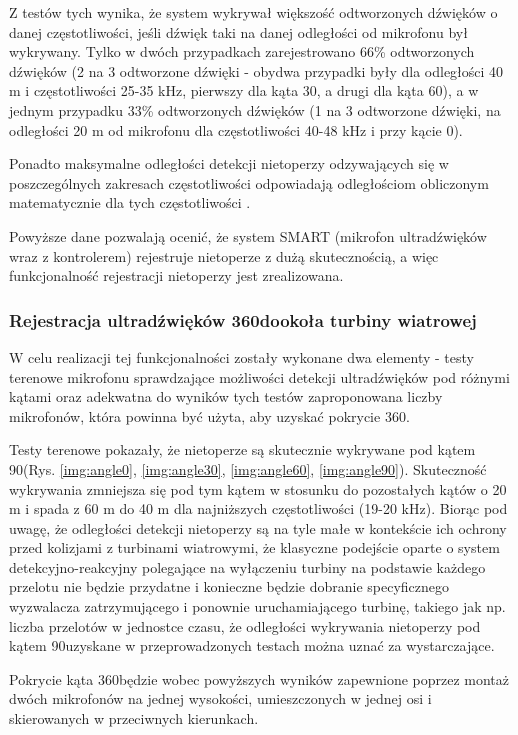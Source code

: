 \documentclass{sprz}
\begin{document}
Z testów tych wynika, że system wykrywał większość odtworzonych dźwięków o danej częstotliwości, jeśli dźwięk taki na danej odległości od mikrofonu był wykrywany. Tylko w dwóch przypadkach zarejestrowano 66\% odtworzonych dźwięków (2 na 3 odtworzone dźwięki - obydwa przypadki były dla odległości 40 m i częstotliwości 25-35 kHz, pierwszy dla kąta 30\textdegree, a drugi dla kąta 60\textdegree ), a w jednym przypadku 33\% odtworzonych dźwięków (1 na 3 odtworzone dźwięki, na odległości 20 m od mikrofonu dla częstotliwości 40-48 kHz i przy kącie 0\textdegree).

Ponadto maksymalne odległości detekcji nietoperzy odzywających się w poszczególnych zakresach częstotliwości odpowiadają odległościom obliczonym matematycznie dla tych częstotliwości \cite{agranat}. 

Powyższe dane pozwalają ocenić, że system SMART (mikrofon ultradźwięków wraz z kontrolerem) rejestruje nietoperze z dużą skutecznością, a więc funkcjonalność rejestracji nietoperzy jest zrealizowana.

\subsubsection{Rejestracja ultradźwięków 360\textdegree dookoła turbiny wiatrowej}
W celu realizacji tej funkcjonalności zostały wykonane dwa elementy - testy terenowe mikrofonu sprawdzające możliwości detekcji ultradźwięków pod różnymi kątami oraz adekwatna do wyników tych testów zaproponowana liczby mikrofonów, która powinna być użyta, aby uzyskać pokrycie 360\textdegree. 

Testy terenowe pokazały, że nietoperze są skutecznie wykrywane pod kątem 90\textdegree (Rys. \ref{img:angle0}, \ref{img:angle30}, \ref{img:angle60}, \ref{img:angle90}). Skuteczność wykrywania zmniejsza się pod tym kątem w stosunku do pozostałych kątów o 20 m i spada z 60 m do 40 m dla najniższych częstotliwości (19-20 kHz). Biorąc pod uwagę, że odległości detekcji nietoperzy są na tyle małe w kontekście ich ochrony przed kolizjami z turbinami wiatrowymi, że klasyczne podejście oparte o system detekcyjno-reakcyjny polegające
na wyłączeniu turbiny na podstawie każdego przelotu nie będzie przydatne i konieczne będzie dobranie specyficznego wyzwalacza zatrzymującego i ponownie uruchamiającego turbinę, takiego jak np. liczba przelotów w jednostce czasu, że odległości wykrywania nietoperzy pod kątem 90\textdegree uzyskane w przeprowadzonych testach można uznać za wystarczające. 

Pokrycie kąta 360\textdegree będzie wobec powyższych wyników zapewnione poprzez montaż dwóch mikrofonów na jednej wysokości, umieszczonych w jednej osi i skierowanych w przeciwnych kierunkach.
\end{document}

